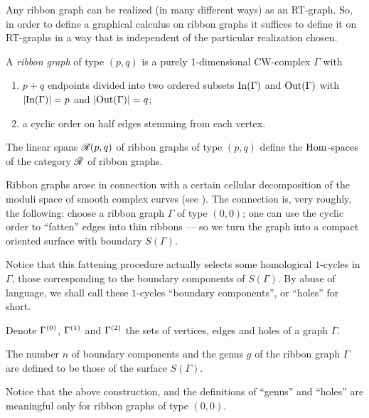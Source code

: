Any ribbon graph can be realized (in many different ways) as an
RT-graph. So, in order to define a graphical calculus on ribbon graphs
it suffices to define it on RT-graphs in a way that is independent of
the particular realization chosen.

\begin{definition}\label{dfn:ribbon-graphs}
  A \emph{ribbon graph} of type $(p,q)$ is a purely 1-dimensional
  CW-complex $\Gamma$ with 
  \begin{enumerate}
  \item $p+q$ endpoints divided into two ordered subsets $\operatorname{In}(\Gamma)$ and
    $\operatorname{Out}(\Gamma)$ with $\lvert\operatorname{In}(\Gamma)\rvert=p$ and $\lvert\operatorname{Out}(\Gamma)\rvert=q$;
  \item a cyclic order on half edges stemming from each vertex.
  \end{enumerate}
  The linear spans $\mathscr{R}_{}(p,q)$ of ribbon graphs of type $(p,q)$ define the
  $\operatorname{Hom}$-spaces of the category $\mathscr{R}_{}$ of ribbon graphs.
\end{definition}%

Ribbon graphs arose in connection with a certain cellular
decomposition of the moduli space of smooth complex curves (see
). The connection is, very roughly, the following:
choose a ribbon graph $\Gamma$ of type $(0,0)$; one can use the cyclic
order to ``fatten'' edges into thin ribbons --- so we turn the graph
into a compact oriented surface with boundary $S(\Gamma)$.

Notice that this fattening procedure actually selects some homological
$1$-cycles in $\Gamma$, those corresponding to the boundary components
of $S(\Gamma)$. By abuse of language, we shall call these $1$-cycles
``boundary components'', or ``holes'' for short.

Denote $\Gamma^{(0)}$, $\Gamma^{(1)}$ and $\Gamma^{(2)}$ the
sets of vertices, edges and holes of a graph $\Gamma$.%

The number $n$ of boundary components and the genus $g$ of the ribbon
graph $\Gamma$ are defined to be those of the surface $S(\Gamma)$.
\begin{remark}
  Notice that the above construction, and the definitions of ``genus''
  and ``holes'' are meaningful only for ribbon graphs of type $(0,0)$.
\end{remark}

